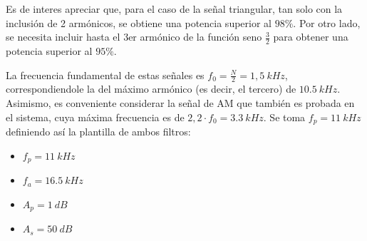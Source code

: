 Es de interes apreciar que, para el caso de la señal triangular, tan solo con la inclusión de 2 armónicos, se obtiene una potencia superior al $98\%$. Por otro lado, se necesita incluir hasta el 3er armónico de la función  seno $\frac{3}{2}$ para obtener una potencia superior al $95\%$.

La frecuencia fundamental de estas señales es $f_0 = \frac{N}{2} = 1,5 \ kHz$, correspondiendole la del máximo armónico (es decir, el tercero) de $10.5 \ kHz$. Asimismo, es conveniente considerar la señal de AM que también es probada en el sistema, cuya máxima frecuencia es de $2,2 \cdot f_0 = 3.3 \ kHz$. Se toma $f_p= 11 \ kHz$  definiendo así la plantilla de ambos filtros:
\begin{multicols}{2}
\begin{itemize}
	\item $f_p = 11\ kHz$
	\item $f_a = 16.5 \ kHz$
	\item $A_p = 1 \ dB$
	\item $A_s = 50 \ dB$
\end{itemize}
\end{multicols}

